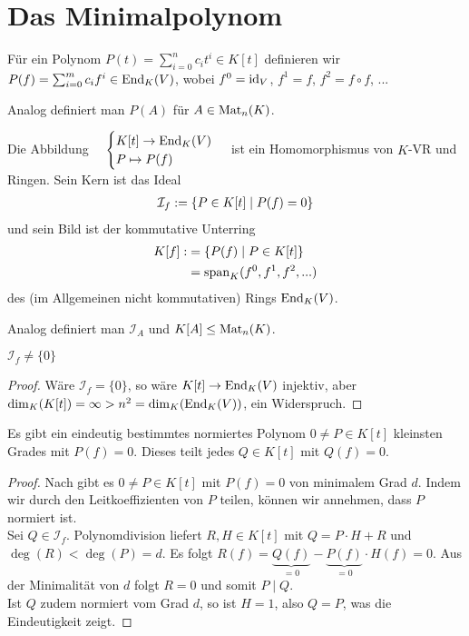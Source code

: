 \section{Das Minimalpolynom}

\begin{definition}
	Für ein Polynom $P(t)=\sum_{i=0}^n c_it^i\in K[t]$ definieren wir $P(f)=\sum_{i=0}^m c_if^i\in\operatorname{End}_K(V)$, wobei $f^0=\operatorname{id}_V$, $f^1=f$, $f^2=f\circ f$, ...
	
	Analog definiert man $P(A)$ für $A\in\operatorname{Mat}_n(K)$.
\end{definition}

\begin{remark}
	Die Abbildung $\quad\begin{cases}K[t]\to \operatorname{End}_K(V)\\ P\mapsto P(f)\end{cases}$ ist ein Homomorphismus von $K$-VR und Ringen. Sein Kern ist das Ideal 
	\begin{align}
		\mathcal{I}_f:=\{P\in K[t]\mid P(f)=0\}\notag
	\end{align}
	und sein Bild ist der kommutative Unterring 
	\begin{align}
		K[f]:&=\{P(f)\mid P\in K[t]\}\notag \\
		&= \operatorname{span}_K(f^0,f^1,f^2,...)\notag
	\end{align}
	des (im Allgemeinen nicht kommutativen) Rings $\operatorname{End}_K(V)$.
	
	Analog definiert man $\mathcal{I}_A$ und $K[A]\le \operatorname{Mat}_n(K)$.
\end{remark}

\begin{lemma}
	$\mathcal{I}_f\neq\{0\}$
\end{lemma}
\begin{proof}
	Wäre $\mathcal{I}_f=\{0\}$, so wäre $K[t]\to \operatorname{End}_K(V)$ injektiv, aber $\dim_K(K[t])= \infty>n^2=\dim_K(\operatorname{End}_K(V))$, ein Widerspruch.
\end{proof}

\begin{proposition}
	Es gibt ein eindeutig bestimmtes normiertes Polynom $0\neq P\in K[t]$ kleinsten Grades mit $P(f)=0$. Dieses teilt jedes $Q\in K[t]$ mit $Q(f)=0$.
\end{proposition}
\begin{proof}
	Nach  gibt es $0\neq P\in K[t]$ mit $P(f)=0$ von minimalem Grad $d$. Indem wir durch den Leitkoeffizienten von $P$ teilen, können wir annehmen, dass $P$ normiert ist. \\
	Sei $Q\in\mathcal{I}_f$. Polynomdivision liefert $R,H\in K[t]$ mit $Q=P\cdot H+R$ und $\deg(R)<\deg(P)=d$. Es folgt $R(f)=\underbrace{Q(f)}_{=0}-\underbrace{P(f)}_{=0}\cdot H(f)=0$. Aus der Minimalität von $d$ folgt $R=0$ und somit $P\mid Q$. \\
	Ist $Q$ zudem normiert vom Grad $d$, so ist $H=1$, also $Q=P$, was die Eindeutigkeit zeigt.
\end{proof}

